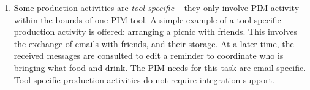 \begin{enumerate}

\item Some production activities are \textit{tool-specific} -- they only involve PIM activity within the bounds of one PIM-tool.  A simple example of a tool-specific production activity is offered: arranging a picnic with friends. This involves the exchange of emails with friends, and their storage.  At a later time, the received messages are consulted to edit a reminder to coordinate who is bringing what food and drink.  The PIM needs for this task are email-specific.  Tool-specific production activities do not require integration support.


\end{enumerate}
